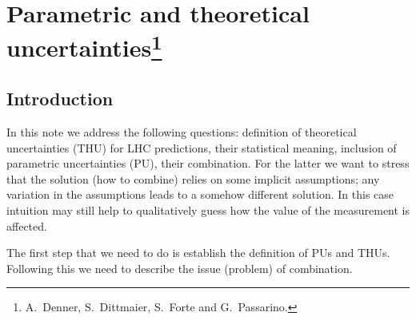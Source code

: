 \section{Parametric and theoretical uncertainties\footnote{A.~Denner,
S.~Dittmaier, S.~Forte and G.~Passarino.}}
\label{THUsection}
\subsection{Introduction}
In this note we address the following questions: definition of theoretical
uncertainties (THU) for LHC predictions, their statistical meaning, inclusion 
of parametric 
uncertainties (PU), their combination.
For the latter we want to stress that the solution (how to combine) relies on
some implicit assumptions; any variation in the assumptions leads to a 
somehow different solution. In this case intuition may still help 
to qualitatively guess how the value of the measurement is affected.

The first step that we need to do is establish the definition of PUs and THUs.
Following this we need to describe the issue (problem) of combination. 
